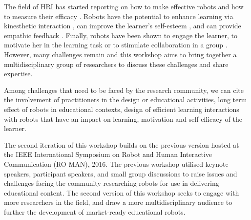 \documentclass{sig-alternate-05-2015}
\begin{document}








The field of HRI has started reporting on how to make 
effective robots and how to measure their efficacy 
\cite{kennedy2016social,tanaka2015pepper}. Robots have the 
potential to enhance learning via kinesthetic interaction \cite{lemaignan2016,tanaka2012children}, can improve 
the learner's self-esteem \cite{lemaignan2016}, and can provide empathic feedback 
\cite{castellano2013towards}. Finally, robots have been shown to engage the 
learner, to motivate her in the learning task or to stimulate collaboration in a 
group \cite{park2013providing}. However, many challenges remain and this workshop aims to bring 
together a multidisciplinary group of researchers to discuss these challenges 
and share expertise.

Among challenges that need to be faced by the research community, we can cite the involvement of practitioners in the design or educational activities, long term effect of robots in educational contexts, design of efficient learning interactions with robots that have an impact on learning, motivation and self-efficacy of the learner.

The second iteration of this workshop builds on the previous version hosted at 
the IEEE International Symposium on Robot and Human Interactive Communication 
(RO-MAN), 2016. The previous workshop utilised keynote speakers, participant 
speakers, and small group discussions to raise issues and challenges facing the 
community researching robots for use in delivering educational content. The 
second version of this workshop seeks to engage with more researchers in the 
field, and draw a more multidisciplinary audience to further the development of 
market-ready educational robots.
\end{document}
